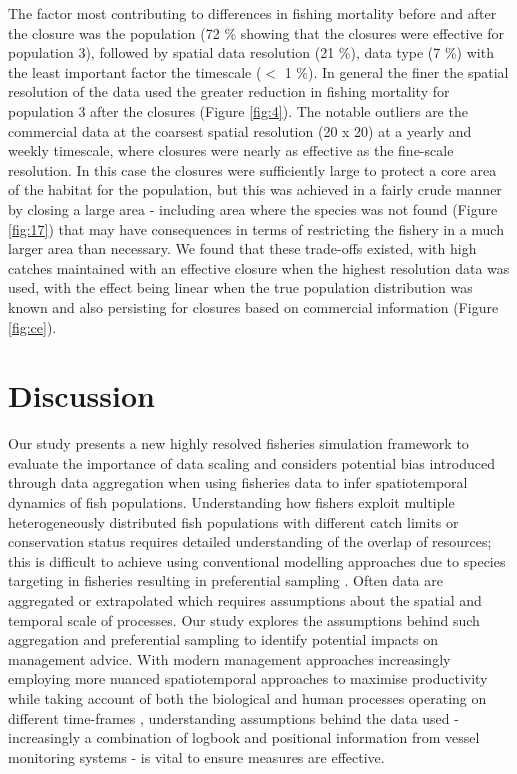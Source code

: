 \documentclass[preprint]{elsarticle}
\begin{document}
The factor most contributing to differences in fishing mortality before and
after the closure was the population (72 \% showing that the closures were
effective for population 3), followed by spatial data resolution (21 \%), data
type (7 \%) with the least important factor the timescale ($<$ 1 \%). In
general the finer the spatial resolution of the data used the greater reduction
in fishing mortality for population 3 after the closures (Figure \ref{fig:4}).
The notable outliers are the commercial data at the coarsest spatial resolution
(20 x 20) at a yearly and weekly timescale, where closures were nearly as
effective as the fine-scale resolution. In this case the closures were
sufficiently large to protect a core area of the habitat for the population,
but this was achieved in a fairly crude manner by closing a large area -
including area where the species was not found (Figure \ref{fig:17}) that may
have consequences in terms of restricting the fishery in a much larger area
than necessary. We found that these trade-offs existed, with high catches
maintained with an effective closure when the highest resolution data was used,
with the effect being linear when the true population distribution was known
and also persisting for closures based on commercial information (Figure
\ref{fig:ce}).\\

\section{Discussion}

Our study presents a new highly resolved fisheries simulation framework to
evaluate the importance of data scaling and considers potential bias introduced
through data aggregation when using fisheries data to infer spatiotemporal
dynamics of fish populations. Understanding how fishers exploit multiple
heterogeneously distributed fish populations with different catch limits or
conservation status requires detailed understanding of the overlap of
resources; this is difficult to achieve using conventional modelling approaches
due to species targeting in fisheries resulting in preferential sampling
\citep{Martinez-Minaya2018}. Often data are aggregated or extrapolated which
requires assumptions about the spatial and temporal scale of processes. Our
study explores the assumptions behind such aggregation and preferential
sampling to identify potential impacts on management advice. With modern
management approaches increasingly employing more nuanced spatiotemporal
approaches to maximise productivity while taking account of both the biological
and human processes operating on different time-frames \citep{Dunn2016},
understanding assumptions behind the data used - increasingly a combination of
logbook and positional information from vessel monitoring systems - is vital to
ensure measures are effective. \\
\end{document}
